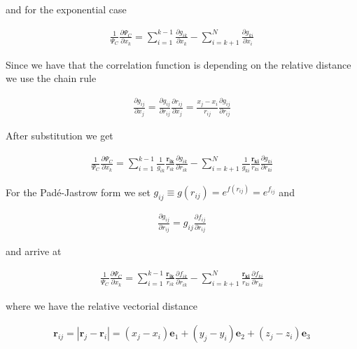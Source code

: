 \documentclass[11pt]{article}
\begin{document}
			and for the exponential case

			\begin{align}
				\frac{1}{\Psi_{C}}\frac{\partial\Psi_{C}}{\partial x_{k}}=\sum_{i=1}^{k-1}\frac{\partial g_{ik}}{\partial x_{k}}-\sum_{i=k+1}^{N}\frac{\partial g_{ki}}{\partial x_{i}}
			\end{align}


			Since we have that the correlation function is depending on the relative
			distance we use the chain rule

			\begin{align}
				\frac{\partial g_{ij}}{\partial x_{j}}=\frac{\partial g_{ij}}{\partial r_{ij}}\frac{\partial r_{ij}}{\partial x_{j}}=\frac{x_{j}-x_{i}}{r_{ij}}\frac{\partial g_{ij}}{\partial r_{ij}}
			\end{align}

			After substitution we get

			\begin{align}
				\frac{1}{\Psi_{C}}\frac{\partial\Psi_{C}}{\partial x_{k}}=\sum_{i=1}^{k-1}\frac{1}{g_{ik}}\frac{\mathbf{r_{ik}}}{r_{ik}}\frac{\partial g_{ik}}{\partial r_{ik}}-\sum_{i=k+1}^{N}\frac{1}{g_{ki}}\frac{\mathbf{r_{ki}}}{r_{ki}}\frac{\partial g_{ki}}{\partial r_{ki}}
			\end{align}

			For the Padé-Jastrow form we set $\ensuremath{g_{ij}\equiv g(r_{ij})=e^{f(r_{ij})}=e^{f_{ij}}}$
			and

			\begin{align}
				\frac{\partial g_{ij}}{\partial r_{ij}}=g_{ij}\frac{\partial f_{ij}}{\partial r_{ij}}
			\end{align}

			and arrive at

			\begin{align}
				\frac{1}{\Psi_{C}}\frac{\partial\Psi_{C}}{\partial x_{k}}=\sum_{i=1}^{k-1}\frac{\mathbf{r_{ik}}}{r_{ik}}\frac{\partial f_{ik}}{\partial r_{ik}}-\sum_{i=k+1}^{N}\frac{\mathbf{r_{ki}}}{r_{ki}}\frac{\partial f_{ki}}{\partial r_{ki}} \label{eq:gradient_ratio_Jastrow}
			\end{align}

			where we have the relative vectorial distance

			\begin{align}
				\mathbf{r}_{ij}=|\mathbf{r}_{j}-\mathbf{r}_{i}|=(x_{j}-x_{i})\mathbf{e}_{1}+(y_{j}-y_{i})\mathbf{e}_{2}+(z_{j}-z_{i})\mathbf{e}_{3}
			\end{align}
\end{document}
